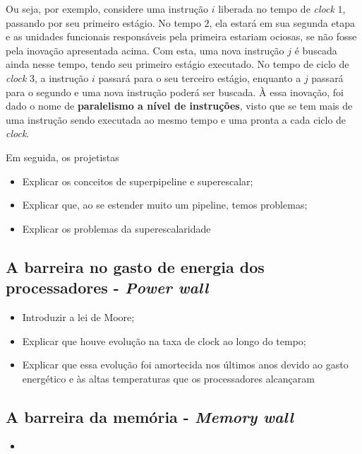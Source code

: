     	Ou seja, por exemplo, 
    	considere uma instrução $i$ liberada no tempo de \textit{clock} $1$, 
    	passando por seu primeiro estágio. No tempo $2$, ela estará em sua
    	segunda etapa e as unidades funcionais responsáveis pela primeira 
    	estariam ociosas, se não fosse pela inovação apresentada acima. Com 
    	esta, uma nova instrução $j$ é buscada ainda nesse tempo, tendo 
    	seu primeiro estágio executado. No tempo de ciclo de \textit{clock} 3,
    	a instrução $i$ passará para o seu terceiro estágio, enquanto a $j$
    	passará para o segundo e uma nova instrução poderá ser buscada. À essa 
    	inovação, foi dado o nome de \textbf{paralelismo a nível de instruções}, 
    	visto que se tem mais de uma instrução sendo executada ao mesmo tempo e 
    	uma pronta a cada ciclo de \textit{clock}.
    	
    	Em seguida, os projetistas
    
        \begin{itemize}
            \item Explicar os conceitos de superpipeline e superescalar;
            \item Explicar que, ao se estender muito um pipeline, temos problemas;
            \item Explicar os problemas da superescalaridade
        \end{itemize}
    
    \subsection{A barreira no gasto de energia dos processadores - \textit{Power wall}}
    
        \begin{itemize}
            \item Introduzir a lei de Moore;
            \item Explicar que houve evolução na taxa de clock ao longo do tempo;
            \item Explicar que essa evolução foi amortecida nos últimos anos devido 
            ao gasto energético e às altas temperaturas que os processadores alcançaram 
        \end{itemize}
    
    \subsection{A barreira da memória - \textit{Memory wall}}
    
	    
	    \begin{itemize}
	    	\item 
	    \end{itemize}